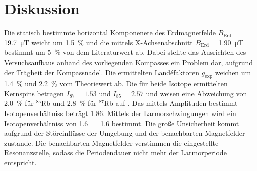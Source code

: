 \section{Diskussion}%
\label{sec:diskussion}
Die statisch bestimmte horizontal Komponenete des Erdmagnetfelde
$B_\text{Erd}=$\SI{19.7}{\micro\tesla} weicht um
\SI{1.5}{\percent} und die mittels X-Achsenabschnitt $B_\text{Erd}=$\SI{1.90}{\micro\tesla} bestimmt um
\SI{5}{\percent} von dem Literaturwert ab.
Dabei stellte das Ausrichten des Versuchsaufbaus anhand des vorliegenden
Kompasses ein Problem dar, aufgrund der Trägheit der Kompassnadel.
Die ermittelten Land\'efaktoren $g_\text{exp}$ weichen um \SI{1.4}{\percent}
und \SI{2.2}{\percent} vom Theoriewert ab.
Die für beide Isotope ermittelten Kernspins betragen $I_{87}=\num{1.53}$ und
$I_{85}=\num{2.57}$ und weisen eine Abweichung von
\SI{2.0}{\percent} für $^{85}$Rb und \SI{2.8}{\percent} für 
$^{87}$Rb auf \cite{rubidium}.
Das mittels Amplituden bestimmt Isotopenverhältniss beträgt \num{1.86}. 
Mittels der Larmorschwingungen wird ein Isotopenverhältniss von \num{1.6 +- 1.6}
bestimmt.
Die große Unsicherheit kommt aufgrund der Störeinflüsse der Umgebung und der
benachbarten Magnetfelder zustande.
Die benachbarten Magnetfelder verstimmen die eingestellte Resonanzstelle,
sodass die Periodendauer nicht mehr der Larmorperiode entspricht.
